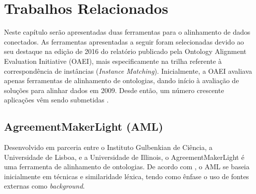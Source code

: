 \section{Trabalhos Relacionados}
% 
% 
%
%
\label{cap:relacionados}
Neste capítulo serão apresentadas duas ferramentas para o alinhamento de dados conectados. As ferramentas apresentadas a seguir foram selecionadas  devido ao seu destaque na edição de 2016 do relatório publicado pela Ontology Alignment Evaluation Initiative (OAEI), mais especificamente na trilha referente à correspondência de instâncias (\textit{Instance Matching}). Inicialmente, a OAEI avaliava apenas ferramentas de alinhamento de ontologias, dando início à avaliação de soluções para alinhar dados em 2009. Desde então, um número crescente aplicações vêm sendo submetidas \cite{cheatham2015results}.
% 
% 
%
%
% 
% 
%
%

\subsection{AgreementMakerLight (AML)}
Desenvolvido em parceria entre o Instituto Gulbenkian de Ciência, a Universidade de Lisboa, e a Universidade de Illinois, o AgreementMakerLight é uma ferramenta de alinhamento de ontologias. De acordo com \cite{fariaoaei}, o AML se baseia inicialmente em técnicas e similaridade léxica, tendo como ênfase o uso de fontes externas como \textit{background}.

